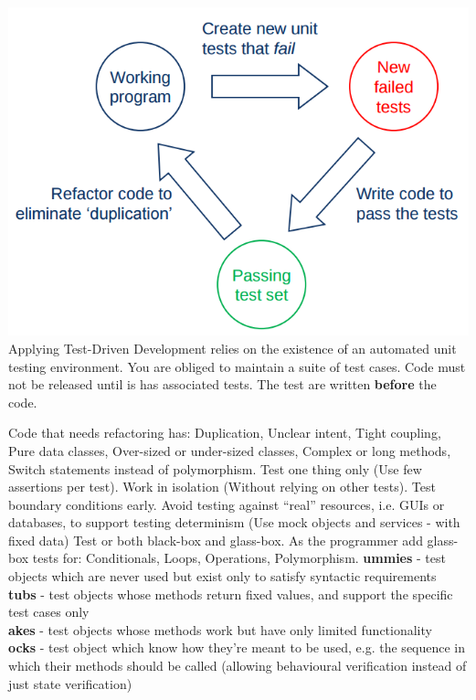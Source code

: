 \documentclass[number]{assignment}
\begin{document}
\begin{landscape}
\begin{multicols}{3}
\begin{multicols}{2}
\includegraphics[width=\linewidth]{Cycle.png}
Applying Test-Driven Development relies on the existence of an automated unit testing environment. You are obliged to maintain a suite of test cases. Code must not be released until is has associated tests. The test are written \textbf{before} the code.
\end{multicols}
Code that needs refactoring has: Duplication, Unclear intent, Tight coupling, Pure data classes, Over-sized or under-sized classes, Complex or long methods, Switch statements instead of polymorphism.
Test one thing only (Use few assertions per test). Work in isolation (Without relying on other tests). Test boundary conditions early. Avoid testing against ``real'' resources, i.e. GUIs or databases, to support testing determinism (Use mock objects and services - with fixed data)
Test or both black-box and glass-box. As the programmer add glass-box tests for: Conditionals, Loops, Operations, Polymorphism.
\textbf{ummies} - test objects which are never used but exist only to satisfy syntactic requirements\\
\textbf{tubs} - test objects whose methods return fixed values, and support the specific test cases only\\
\textbf{akes} - test objects whose methods work but have only limited functionality\\
\textbf{ocks} - test object which know how they're meant to be used, e.g. the sequence in which their methods should be called (allowing behavioural verification instead of just state verification)

\end{multicols}
\end{landscape}
\end{document}

